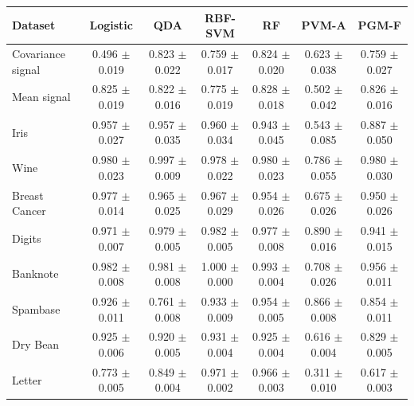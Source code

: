 \begin{tabular}{lcccccc}
\toprule
Dataset & Logistic & QDA & RBF-SVM & RF & PVM-A & PGM-F \\
\midrule
Covariance signal & 0.496 $\pm$ 0.019 & 0.823 $\pm$ 0.022 & 0.759 $\pm$ 0.017 & 0.824 $\pm$ 0.020 & 0.623 $\pm$ 0.038 & 0.759 $\pm$ 0.027 \\
Mean signal & 0.825 $\pm$ 0.019 & 0.822 $\pm$ 0.016 & 0.775 $\pm$ 0.019 & 0.828 $\pm$ 0.018 & 0.502 $\pm$ 0.042 & 0.826 $\pm$ 0.016 \\
Iris & 0.957 $\pm$ 0.027 & 0.957 $\pm$ 0.035 & 0.960 $\pm$ 0.034 & 0.943 $\pm$ 0.045 & 0.543 $\pm$ 0.085 & 0.887 $\pm$ 0.050 \\
Wine & 0.980 $\pm$ 0.023 & 0.997 $\pm$ 0.009 & 0.978 $\pm$ 0.022 & 0.980 $\pm$ 0.023 & 0.786 $\pm$ 0.055 & 0.980 $\pm$ 0.030 \\
Breast Cancer & 0.977 $\pm$ 0.014 & 0.965 $\pm$ 0.025 & 0.967 $\pm$ 0.029 & 0.954 $\pm$ 0.026 & 0.675 $\pm$ 0.026 & 0.950 $\pm$ 0.026 \\
Digits & 0.971 $\pm$ 0.007 & 0.979 $\pm$ 0.005 & 0.982 $\pm$ 0.005 & 0.977 $\pm$ 0.008 & 0.890 $\pm$ 0.016 & 0.941 $\pm$ 0.015 \\
Banknote & 0.982 $\pm$ 0.008 & 0.981 $\pm$ 0.008 & 1.000 $\pm$ 0.000 & 0.993 $\pm$ 0.004 & 0.708 $\pm$ 0.026 & 0.956 $\pm$ 0.011 \\
Spambase & 0.926 $\pm$ 0.011 & 0.761 $\pm$ 0.008 & 0.933 $\pm$ 0.009 & 0.954 $\pm$ 0.005 & 0.866 $\pm$ 0.008 & 0.854 $\pm$ 0.011 \\
Dry Bean & 0.925 $\pm$ 0.006 & 0.920 $\pm$ 0.005 & 0.931 $\pm$ 0.004 & 0.925 $\pm$ 0.004 & 0.616 $\pm$ 0.004 & 0.829 $\pm$ 0.005 \\
Letter & 0.773 $\pm$ 0.005 & 0.849 $\pm$ 0.004 & 0.971 $\pm$ 0.002 & 0.966 $\pm$ 0.003 & 0.311 $\pm$ 0.010 & 0.617 $\pm$ 0.003 \\
\bottomrule
\end{tabular}
